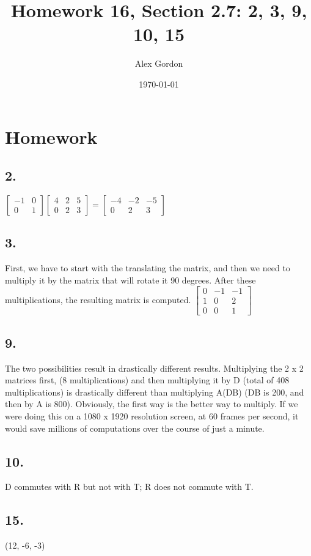 \documentclass[12]{scrartcl}
\begin{document}
\title{Homework 16, Section 2.7: 2, 3, 9, 10, 15}
\author{Alex Gordon}
\date{\today}
\maketitle
\section*{Homework}
\subsection*{2.}
$\begin{bmatrix} -1 & 0\\  0 & 1   \end{bmatrix} \begin{bmatrix} 4 & 2 & 5\\  0 & 2 & 3  \end{bmatrix} = \begin{bmatrix} -4 & -2 & -5\\  0 & 2 & 3   \end{bmatrix}$
\subsection*{3.}
First, we have to start with the translating the matrix, and then we need to multiply it by the matrix that will rotate it 90 degrees. After these multiplications, the resulting matrix is computed. 
$\begin{bmatrix}0 & -1 & -1\\ 1 & 0 & 2 \\ 0 & 0 & 1   \end{bmatrix}$
\subsection*{9.}
The two possibilities result in drastically different results. Multiplying the 2 x 2 matrices first, (8 multiplications) and then multiplying it by D (total of 408 multiplications) is drastically different than multiplying A(DB) (DB is 200, and then by A is 800). Obviously, the first way is the better way to multiply. If we were doing this on a 1080 x 1920 resolution screen, at 60 frames per second, it would save millions of computations over the course of just a minute. 
\subsection*{10.}
D commutes with R but not with T; R does not commute with T. 
\subsection*{15.}
(12, -6, -3)
\end{document}
